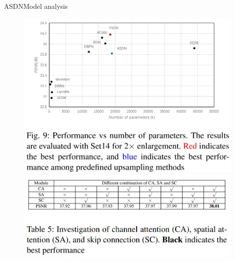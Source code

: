 \documentclass{beamer}
\begin{document}
\begin{frame}{ASDN}{Model analysis}
    \begin{figure}
        \centering
        \includegraphics[height=0.5\textheight,keepaspectratio]{asdn-psnr-n_params.png}
        \vspace*{100px}
        \includegraphics[height=0.5\textheight,keepaspectratio]{asdn-ablation-study.png}
    \end{figure}
\end{frame}
\end{document}
